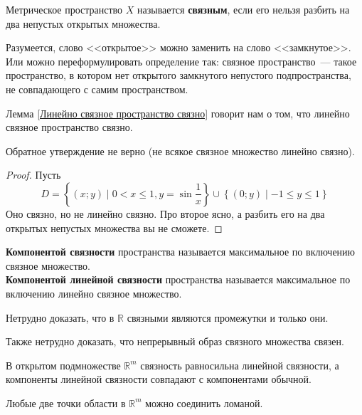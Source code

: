 \documentclass{article}
\begin{document}
    \begin{definition}
        Метрическое пространство $X$ называется \textbf{связным}, если его нельзя разбить на два непустых открытых множества.
    \end{definition}
    \begin{remark}
        Разумеется, слово <<открытое>> можно заменить на слово <<замкнутое>>. Или можно переформулировать определение так: связное пространство~--- такое пространство, в котором нет открытого замкнутого непустого подпространства, не совпадающего с самим пространством.
    \end{remark}
    \begin{remark}
        Лемма \ref{Линейно связное пространство связно} говорит нам о том, что линейно связное пространство связно.
    \end{remark}
    \begin{claim}
        Обратное утверждение не верно (не всякое связное множество линейно связно).
    \end{claim}
    \begin{proof}
        Пусть
        $$
        D=\left\{(x;y)\mid 0<x\leqslant 1,y=\sin\frac1x\right\}\cup\left\{(0;y)\mid-1\leqslant y\leqslant 1\right\}
        $$
        Оно связно, но не линейно связно. Про второе ясно, а разбить его на два открытых непустых множества вы не сможете.
    \end{proof}    
    \begin{definition}
        \textbf{Компонентой связности} пространства называется максимальное по включению связное множество.\\
        \textbf{Компонентой линейной связности} пространства называется максимальное по включению линейно связное множество.
    \end{definition}
    \begin{claim}
        Нетрудно доказать, что в $\mathbb R$ связными являются промежутки и только они.
    \end{claim}
    \begin{claim}
        Также нетрудно доказать, что непрерывный образ связного множества связен.
    \end{claim}
    \begin{claim}
        В открытом подмножестве $\mathbb R^m$ связность равносильна линейной связности, а компоненты линейной связности совпадают с компонентами обычной.
    \end{claim}
    \begin{theorem}
        Любые две точки области в $\mathbb R^m$ можно соединить ломаной.
    \end{theorem}
\end{document}
